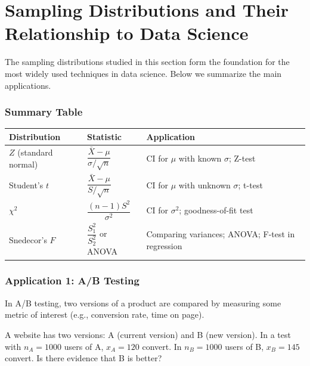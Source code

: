 \section{Sampling Distributions and Their Relationship to Data Science}

The sampling distributions studied in this section form the foundation for the most widely used techniques in data science. Below we summarize the main applications.

\subsubsection{Summary Table}

\begin{center}
\begin{tabular}{|l|l|l|}
\hline
\textbf{Distribution} & \textbf{Statistic} & \textbf{Application} \\
\hline
$Z$ (standard normal) & $\dfrac{\bar{X}-\mu}{\sigma/\sqrt{n}}$
& CI for $\mu$ with known $\sigma$; Z-test \\
\hline
Student's $t$ & $\dfrac{\bar{X}-\mu}{S/\sqrt{n}}$
& CI for $\mu$ with unknown $\sigma$; t-test \\
\hline
$\chi^2$ & $\dfrac{(n-1)S^2}{\sigma^2}$
& CI for $\sigma^2$; goodness-of-fit test \\
\hline
Snedecor's $F$ & $\dfrac{S_1^2}{S_2^2}$ or ANOVA
& Comparing variances; ANOVA; F-test in regression \\
\hline
\end{tabular}
\end{center}

\subsubsection{Application 1: A/B Testing}

In A/B testing, two versions of a product are compared by measuring some metric of interest (e.g., conversion rate, time on page).

\begin{ejemplo}
 \label{exmp:3.2.7}
A website has two versions: A (current version) and B (new version). In a test with $n_A = 1000$ users of A, $x_A = 120$ convert. In $n_B = 1000$ users of B, $x_B = 145$ convert. Is there evidence that B is better?
\end{ejemplo}

